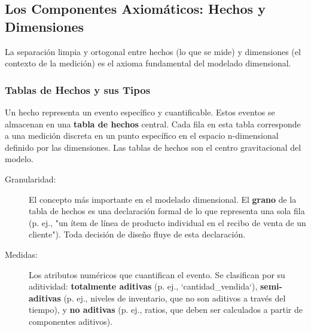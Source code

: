 \documentclass{article}
\begin{document}
\subsection{Los Componentes Axiomáticos: Hechos y Dimensiones}
La separación limpia y ortogonal entre hechos (lo que se mide) y dimensiones (el contexto de la medición) es el axioma fundamental del modelado dimensional.

\subsubsection{Tablas de Hechos y sus Tipos}
Un hecho representa un evento específico y cuantificable. Estos eventos se almacenan en una \textbf{tabla de hechos} central. Cada fila en esta tabla corresponde a una medición discreta en un punto específico en el espacio n-dimensional definido por las dimensiones. Las tablas de hechos son el centro gravitacional del modelo.

\begin{description}
    \item[Granularidad:] El concepto más importante en el modelado dimensional. El \textbf{grano} de la tabla de hechos es una declaración formal de lo que representa una sola fila (p. ej., "un ítem de línea de producto individual en el recibo de venta de un cliente"). Toda decisión de diseño fluye de esta declaración.
    \item[Medidas:] Los atributos numéricos que cuantifican el evento. Se clasifican por su aditividad: \textbf{totalmente aditivas} (p. ej., `cantidad_vendida`), \textbf{semi-aditivas} (p. ej., niveles de inventario, que no son aditivos a través del tiempo), y \textbf{no aditivas} (p. ej., ratios, que deben ser calculados a partir de componentes aditivos).
\end{description}
\end{document}
